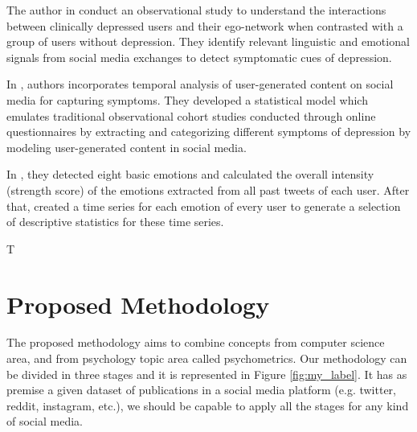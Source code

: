 \documentclass[sigconf]{acmart}
\begin{document}
The author in \cite{Vedula2017} conduct an observational study to understand the interactions between clinically depressed users and their ego-network when contrasted with a group of users without depression. They identify relevant linguistic and emotional signals from social media exchanges to detect symptomatic cues of depression.

In \cite{Yazdavar:2017:SAM:3110025.3123028}, authors incorporates temporal analysis of user-generated content on social media for capturing symptoms. They developed a statistical model which emulates traditional observational cohort studies conducted through online questionnaires by extracting and categorizing different symptoms of depression by modeling user-generated content in social media.

In \cite{Chen2018}, they detected eight basic emotions and calculated the overall intensity (strength score) of the emotions extracted from all past tweets of each user. After that, created a time series for each emotion of every user to generate a selection of descriptive statistics for these time series.

T

\section{Proposed Methodology}\label{sec:proposal}

The proposed methodology aims to combine concepts from computer science area, and from psychology topic area called psychometrics.
Our methodology can be divided in three stages and it is represented in Figure \ref{fig:my_label}. It has as premise a given dataset of publications in a social media platform (e.g. twitter, reddit, instagram, etc.), we should be capable to apply all the stages for any kind of social media.
\end{document}
